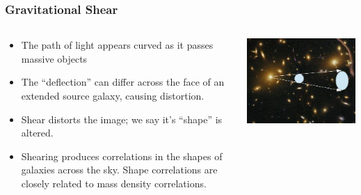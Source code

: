 \documentclass{beamer}
\begin{document}
\frame
{
    \fontsize{10}{\baselineskip}

    \frametitle{Gravitational Shear}

    \begin{columns}

        \begin{column}{0.5\textwidth}

            \begin{itemize}
                \item The path of light appears curved as it passes massive objects
                \item The ``deflection'' can differ across the face of an extended source galaxy, causing distortion.
                \item Shear distorts the image; we say it's ``shape'' is altered.
                \item Shearing produces correlations in the shapes of galaxies across the sky.
                    Shape correlations are closely related to mass density
                    correlations.

            \end{itemize}
        \end{column}
        \begin{column}{0.5\textwidth}
            \includegraphics[width=\textwidth]{shear-illustration-crop.jpg}
        \end{column}
    \end{columns}
}
\end{document}
